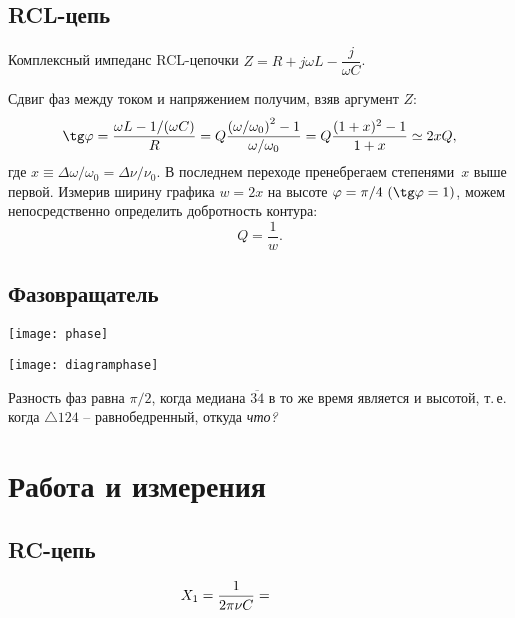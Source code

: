 \documentclass{physlab}
\begin{document}
\subsection*{RCL-цепь}

\vspace{-1.75ex}
Комплексный импеданс RCL-цепочки $Z=R+j\omega L - \dfrac{j}{\omega C}$.
\vspace{.75\parskip}

Сдвиг фаз между током и напряжением получим, взяв аргумент $Z$:
$$\tg\varphi = \frac{\omega L - 1/(\omega C)}{R} = Q\frac{\left(\omega/\omega_0\right)^2 - 1}{\omega/\omega_0} = Q\frac{(1+x)^2-1}{1+x} \simeq 2x Q,$$
где $x \equiv \Delta \omega / \omega_0 = \Delta \nu / \nu_0$.
В последнем переходе пренебрегаем степенями~$x$ выше первой.
Измерив ширину графика $w=2x$ на высоте $\varphi = \pi / 4\ (\tg\varphi = 1)$, можем непосредственно определить добротность контура:
$$Q = \frac{1}{w}.$$

\subsection*{Фазовращатель}

\vspace{-7.5mm}
\begin{minipage}{.65\tw}
    \texttt{[image: phase]}
\end{minipage}
\hfill
\begin{minipage}{.32\tw}
    \texttt{[image: diagramphase]}
\end{minipage}\smallskip

Разность фаз равна $\pi /2$, когда медиана $\overline{34}$ в то же время является и высотой, т.\,е. когда $\triangle 124$ -- равнобедренный, откуда \emph{что?}

\section{Работа и измерения}

\subsection*{RC-цепь}

$$X_1 = \dfrac{1}{2 \pi \nu C} = \val$$
\end{document}
